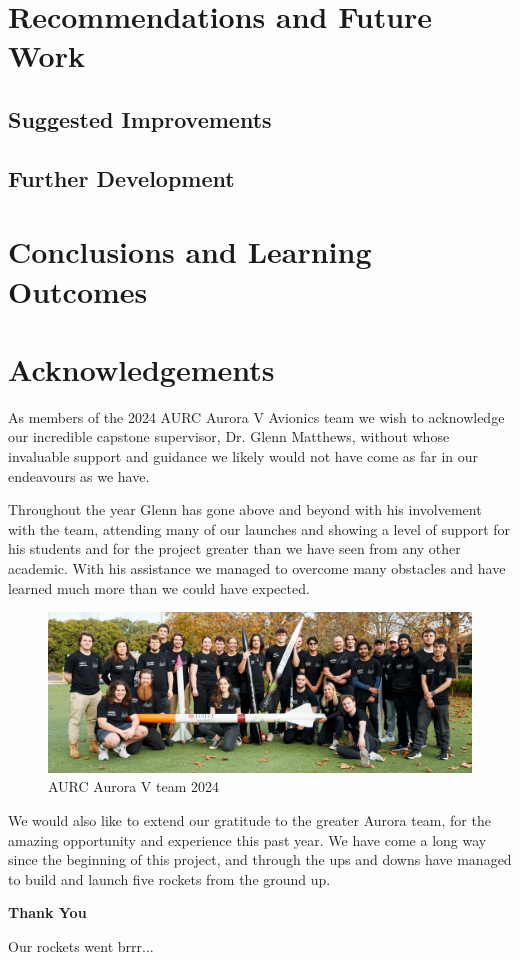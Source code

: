 \section{Recommendations and Future Work}
\subsection{Suggested Improvements}
\subsection{Further Development}

\section{Conclusions and Learning Outcomes}

\clearpage
\section{Acknowledgements}
As members of the 2024 AURC Aurora V Avionics team we wish to acknowledge our incredible capstone supervisor, Dr. Glenn Matthews, without whose invaluable support and guidance we likely would not have come as far in our endeavours as we have. 

Throughout the year Glenn has gone above and beyond with his involvement with the team, attending many of our launches and showing a level of support for his students and for the project greater than we have seen from any other academic. With his assistance we managed to overcome many obstacles and have learned much more than we could have expected.

\begin{figure}[h]
    \begin{center}
        \includegraphics[width=\textwidth]{./img/aurora_team.jpg}
    \end{center}
    \caption{AURC Aurora V team 2024}\label{fig:aurora_team}
\end{figure}

We would also like to extend our gratitude to the greater Aurora team, for the amazing opportunity and experience this past year. We have come a long way since the beginning of this project, and through the ups and downs have managed to build and launch five rockets from the ground up. 

\hfill{}\textbf{Thank You}\hfill{}

\vfill{}\hfill{}Our rockets went brrr...
